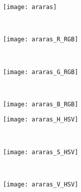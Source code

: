 \begin{figure}[!ht]
    \begin{subfigure}[t]{\textwidth+20pt\relax}
    	\texttt{[image: araras]}
    \end{subfigure} \\    
     
    \begin{subfigure}[t]{\textwidth+20pt\relax}
    	\texttt{[image: araras\_R\_RGB]}
    \end{subfigure}      
    ~ %
    \begin{subfigure}[b]{0.3\textwidth}
        \texttt{[image: araras\_G\_RGB]}
    \end{subfigure}
    ~ %
    \begin{subfigure}[b]{0.3\textwidth}
        \texttt{[image: araras\_B\_RGB]}
    \end{subfigure} \vspace{5pt}      
    
    \begin{subfigure}[t]{\textwidth+20pt\relax}
    	\texttt{[image: araras\_H\_HSV]}
    \end{subfigure}     
    ~ %
    \begin{subfigure}[b]{0.3\textwidth}
        \texttt{[image: araras\_S\_HSV]}
    \end{subfigure}
    ~ %
    \begin{subfigure}[b]{0.3\textwidth}
        \texttt{[image: araras\_V\_HSV]}
    \end{subfigure} \vspace{5pt} 
    

\end{figure}
